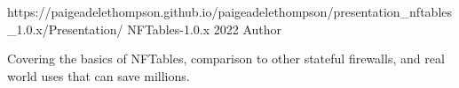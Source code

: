 \begin{cventries}
  \cventry    
    {https://paigeadelethompson.github.io/paigeadelethompson/presentation\_nftables\_1.0.x/Presentation/}
    {NFTables-1.0.x}
    {2022}
    {Author}
    {
      \begin{cvitems} 
        \item{Covering the basics of NFTables, comparison to other stateful firewalls, and real world uses that can save millions.}
      \end{cvitems}
    }
\end{cventries}